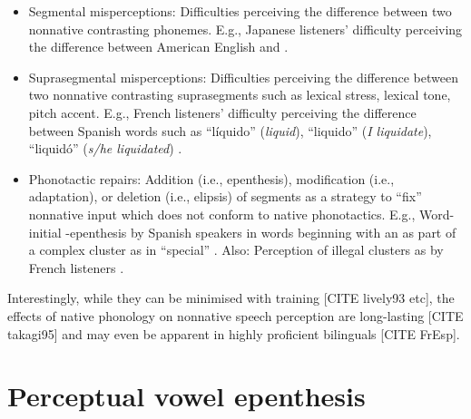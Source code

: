 \begin{itemize}
\item Segmental misperceptions: Difficulties perceiving the difference between two nonnative contrasting phonemes. E.g., Japanese listeners' difficulty perceiving the difference between American English  and  \cite{goto1991, miyawaki1981}.
\item Suprasegmental misperceptions: Difficulties perceiving the difference between two nonnative contrasting suprasegments such as lexical stress, lexical tone, pitch accent. E.g., French listeners' difficulty perceiving the difference between Spanish words such as ``líquido''  (\textit{liquid}), ``liquido''  (\textit{I liquidate}), ``liquidó''  (\textit{s/he liquidated}) \cite{dupoux1997, dupoux2008}.
\item Phonotactic repairs: Addition (i.e., epenthesis), modification (i.e., adaptation), or deletion (i.e., elipsis) of segments as a strategy to ``fix'' nonnative input which does not conform to native phonotactics. E.g., Word-initial -epenthesis by Spanish speakers in words beginning with an  as part of a complex cluster as in ``special'' \cite{halle2014}. Also: Perception of illegal  clusters as  by French listeners \cite{halle2007}.  
\end{itemize}

Interestingly, while they can be minimised with training [CITE lively93 etc], the effects of native phonology on nonnative speech perception are long-lasting [CITE takagi95] and may even be apparent in highly proficient bilinguals [CITE FrEsp].   

\section{Perceptual vowel epenthesis}


